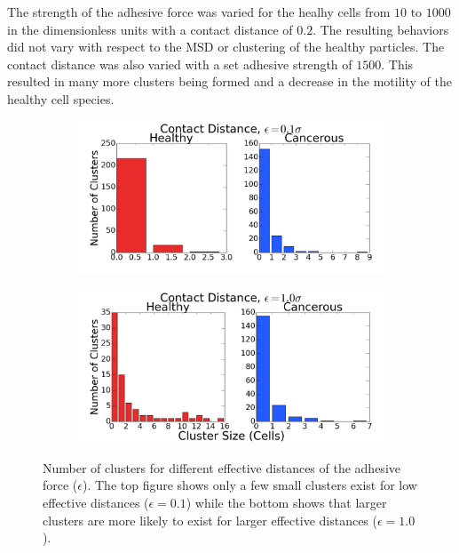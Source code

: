 \documentclass[aps,prb,twocolumn,groupedaddress,nofootinbib,floatfix]{revtex4}
\begin{document}
The strength of the adhesive force was varied for the healhy cells from $10$ to $1000$ in the dimensionless units with a contact distance of $0.2$.
The resulting behaviors did not vary with respect to the MSD or clustering of the healthy particles.
The contact distance was also varied with a set adhesive strength of $1500$.
This resulted in many more clusters being formed and a decrease in the motility of the healthy cell species.


\begin{figure}
  \begin{subfigure}{\columnwidth}
    \includegraphics[width=1.0\columnwidth]{images/contact1.png}
  \end{subfigure}
  \begin{subfigure}{\columnwidth}
    \includegraphics[width=1.0\columnwidth]{images/contact2.png}
  \end{subfigure}
  \caption{Number of clusters for different effective distances of the adhesive force ($\epsilon$). The top figure shows only a few small clusters exist for low effective distances ($\epsilon=0.1$) while the bottom shows that larger clusters are more likely to exist for larger effective distances ($\epsilon=1.0$).}
  \label{fig:contact}
\end{figure}
\end{document}
